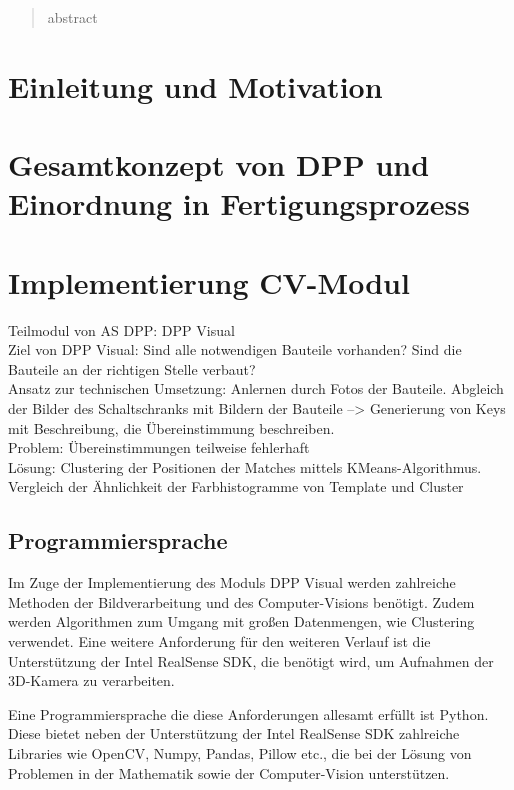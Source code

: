 \documentclass[
    type=Projektarbeit,
    status=draft, %
    language=german, %
    bibengine=bibtex,
]{unibwm-inf-thesis}
\begin{document}
    \tableofcontents

    \mainmatter
    \begin{abstract}
        abstract
    \end{abstract}


    \chapter{Einleitung und Motivation}


    \chapter{Gesamtkonzept von DPP und Einordnung in Fertigungsprozess}


    \chapter{Implementierung CV-Modul}
    Teilmodul von AS DPP: DPP Visual\\
    Ziel von DPP Visual: Sind alle notwendigen Bauteile vorhanden?
    Sind die Bauteile an der richtigen Stelle verbaut?\\
    Ansatz zur technischen Umsetzung: Anlernen durch Fotos der Bauteile.
    Abgleich der Bilder des Schaltschranks mit Bildern der Bauteile --> Generierung von Keys mit Beschreibung, die
    Übereinstimmung beschreiben.\\
    Problem: Übereinstimmungen teilweise fehlerhaft \\
    Lösung: Clustering der Positionen der Matches mittels KMeans-Algorithmus.
    Vergleich der Ähnlichkeit der Farbhistogramme von Template und Cluster


    \section{Programmiersprache}
    Im Zuge der Implementierung des Moduls DPP Visual werden zahlreiche Methoden der Bildverarbeitung und des
    Computer-Visions benötigt.
    Zudem werden Algorithmen zum Umgang mit großen Datenmengen, wie Clustering verwendet.
    Eine weitere Anforderung für den weiteren Verlauf ist die Unterstützung der Intel RealSense SDK, die benötigt wird,
    um Aufnahmen der 3D-Kamera zu verarbeiten.

    Eine Programmiersprache die diese Anforderungen allesamt erfüllt ist Python.
    Diese bietet neben der Unterstützung der Intel RealSense SDK zahlreiche Libraries wie OpenCV, Numpy, Pandas,
    Pillow etc., die bei der Lösung von Problemen in der Mathematik sowie der Computer-Vision unterstützen.
\end{document}
